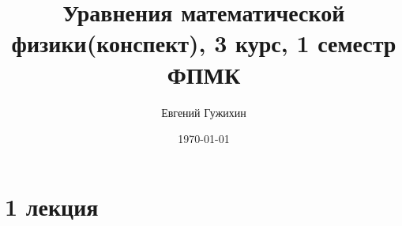 \documentclass[a5paper,10pt]{article}
\author{Евгений Гужихин}
\title{Уравнения математической физики(конспект), 3 курс, 1 семестр ФПМК}
\date{\today}
\begin{document}
	\maketitle
	\tableofcontents{}
	\newpage

	\section{1 лекция}
		\subsection{}
			\paragraph{}
\end{document}
